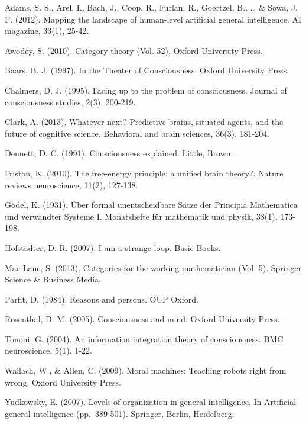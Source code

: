 \documentclass[12pt]{article}
\begin{document}
Adams, S. S., Arel, I., Bach, J., Coop, R., Furlan, R., Goertzel, B.,
\ldots{} \& Sowa, J. F. (2012). Mapping the landscape of human-level
artificial general intelligence. AI magazine, 33(1), 25-42.

Awodey, S. (2010). Category theory (Vol. 52). Oxford University Press.

Baars, B. J. (1997). In the Theater of Consciousness. Oxford University
Press.

Chalmers, D. J. (1995). Facing up to the problem of consciousness.
Journal of consciousness studies, 2(3), 200-219.

Clark, A. (2013). Whatever next? Predictive brains, situated agents, and
the future of cognitive science. Behavioral and brain sciences, 36(3),
181-204.

Dennett, D. C. (1991). Consciousness explained. Little, Brown.

Friston, K. (2010). The free-energy principle: a unified brain theory?.
Nature reviews neuroscience, 11(2), 127-138.

G\"{o}del, K. (1931). \"{U}ber formal unentscheidbare S\"{a}tze der Principia
Mathematica und verwandter Systeme I. Monatshefte f\"{u}r mathematik und
physik, 38(1), 173-198.

Hofstadter, D. R. (2007). I am a strange loop. Basic Books.

Mac Lane, S. (2013). Categories for the working mathematician (Vol. 5).
Springer Science \& Business Media.

Parfit, D. (1984). Reasons and persons. OUP Oxford.

Rosenthal, D. M. (2005). Consciousness and mind. Oxford University
Press.

Tononi, G. (2004). An information integration theory of consciousness.
BMC neuroscience, 5(1), 1-22.

Wallach, W., \& Allen, C. (2009). Moral machines: Teaching robots right
from wrong. Oxford University Press.

Yudkowsky, E. (2007). Levels of organization in general intelligence. In
Artificial general intelligence (pp.~389-501). Springer, Berlin,
Heidelberg.
\end{document}
